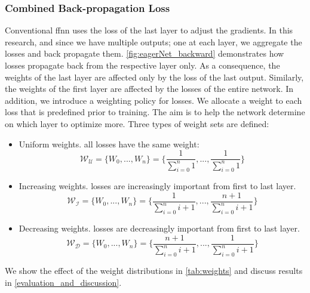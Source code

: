 \documentclass[conference]{IEEEtran}
\begin{document}
\subsubsection{Combined Back-propagation Loss}
Conventional \gls{ffnn} uses the loss of the last layer to adjust the gradients. In this research, and since we have multiple outputs; one at each layer, we aggregate the losses and back propagate them. \autoref{fig:eagerNet_backward} demonstrates how losses propagate back from the respective layer only. As a consequence, the weights of the last layer are affected only by the loss of the last output. Similarly, the weights of the first layer are affected by the losses of the entire network. In addition, we introduce a weighting policy for losses. We allocate a weight to each loss that is predefined prior to training. The aim is to help the network determine on which layer to optimize more. Three types of weight sets are defined:
\begin{itemize}
\item Uniform weights. all losses have the same weight:
\begin{equation}
\mathcal{W_U} = \lbrace W_{0}, ..., W_{n} \rbrace = \lbrace \frac{1}{\sum_{i=0}^{n} 1}, ..., \frac{1}{\sum_{i=0}^{n} 1} \rbrace
\end{equation}

\item Increasing weights. losses are increasingly important from first to last layer.
\begin{equation}
\mathcal{W_I} = \lbrace W_{0}, ..., W_{n} \rbrace = \lbrace \frac{1}{\sum_{i=0}^{n} i+1}, ..., \frac{n+1}{\sum_{i=0}^{n} i+1} \rbrace
\end{equation}

\item Decreasing weights. losses are decreasingly important from first to last layer.
\begin{equation}
\mathcal{W_D} = \lbrace W_{0}, ..., W_{n} \rbrace = \lbrace \frac{n+1}{\sum_{i=0}^{n} i+1}, ..., \frac{1}{\sum_{i=0}^{n} i+1} \rbrace
\end{equation}

\end{itemize}

We show the effect of the weight distributions in \autoref{tab:weights} and discuss results in \autoref{evaluation_and_discussion}.

\end{document}
